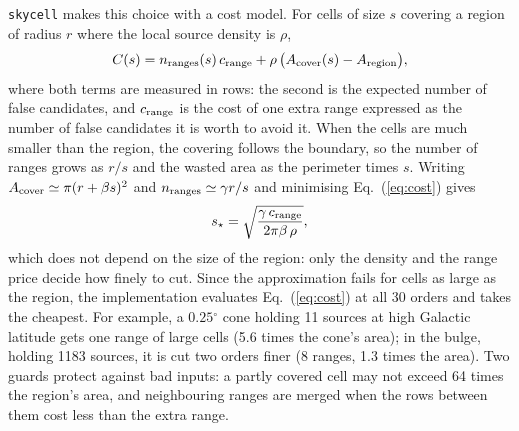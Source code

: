 \documentclass[final,5p,times,twocolumn,authoryear]{elsarticle}
\newcommand{\degr}{\ensuremath{^{\circ}}}
\begin{document}
\texttt{skycell} makes this choice with a cost model. For cells of size $s$ covering a
region of radius $r$ where the local source density is $\rho$,
\begin{equation}
  C(s) = n_{\rm ranges}(s)\,c_{\rm range} + \rho\,\bigl(A_{\rm cover}(s) - A_{\rm region}\bigr),
  \label{eq:cost}
\end{equation}
where both terms are measured in rows: the second is the expected number of false
candidates, and $c_{\rm range}$ is the cost of one extra range expressed as the number
of false candidates it is worth to avoid it. When the cells are much smaller than the
region, the covering follows the boundary, so the number of ranges grows as $r/s$ and the
wasted area as the perimeter times $s$. Writing $A_{\rm cover}\simeq\pi(r+\beta s)^2$ and
$n_{\rm ranges}\simeq\gamma r/s$ and minimising Eq.~(\ref{eq:cost}) gives
\begin{equation}
  s_\star = \sqrt{\frac{\gamma\,c_{\rm range}}{2\pi\beta\,\rho}},
  \label{eq:sstar}
\end{equation}
which does not depend on the size of the region: only the density and the range price
decide how finely to cut. Since the approximation fails for cells as large as the region, the
implementation evaluates Eq.~(\ref{eq:cost}) at all 30 orders and takes the cheapest. For example, a $0.25\degr$ cone holding 11 sources at high
Galactic latitude gets one range of large cells (5.6 times the cone's area); in the
bulge, holding 1183 sources, it is cut two orders finer (8 ranges, 1.3 times the area).
Two guards protect against bad inputs: a partly covered cell may not exceed 64 times the
region's area, and neighbouring ranges are merged when the rows between them cost less
than the extra range.
\end{document}
